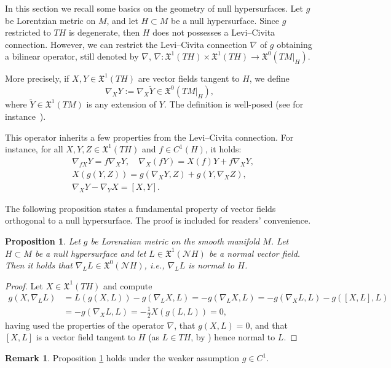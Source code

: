 \documentclass[12pt,a4paper]{amsart}
\theoremstyle{plain}
\newtheorem{proposition}[lemma]{Proposition}
\theoremstyle{definition}
\newtheorem{remark}[lemma]{Remark}
\numberwithin{equation}{section}
\newcommand{\vfield}{\mathfrak{X}}
\newcommand{\normal}{\mathscr{N}}
\begin{document}
In this section we recall some basics on the geometry of null hypersurfaces. 
%
Let $g$ be Lorentzian metric on $M$, and let $H\subset M$ be a null
hypersurface.
%
Since $g$ restricted to $TH$ is degenerate, then $H$ does
not possesses a Levi--Civita connection.
%
However, we can restrict the Levi--Civita connection $\nabla$ of $g$
obtaining a bilinear operator, still denoted by $\nabla$, $\nabla: \vfield^1(TH)\times \vfield^1(TH)
\to\vfield^0 (TM|_{H})$.
%

More precisely, if $X,Y\in\vfield^1(TH)$ are vector fields tangent to
$H$, we define
$$\nabla_X Y:=\nabla_X \tilde Y\in\vfield^0(TM|_H),$$
where
$\tilde Y\in\vfield^1(TM)$ is any extension of $Y$. 
The
definition is well-posed (see for instance~\cite{GallotHulinLafontaine04}).


%
%

This operator inherits a few properties from the
Levi--Civita connection. For instance, for all  $X,Y,Z\in\vfield^1(TH)$ and $f\in C^1(H)$, it holds:
\begin{align*}
  &
    \nabla_{fX} Y
    =f\nabla_X Y
    ,
    \quad
    \nabla_X (fY)
    =X(f) Y+f\nabla_X Y
    ,
  \\
  &
    X( g(Y,Z))
    =
    g(\nabla_X Y,Z)
    +
    g(Y,\nabla_X Z)
    ,
  \\
  &
    \nabla_X Y
    -\nabla_Y X
    =
    [X,Y]
    .
\end{align*}



The following proposition 
states a fundamental property of vector fields orthogonal 
to a null hypersurface. 
The proof is included for readers' convenience. 

\begin{proposition}
\label{P:proportional}
  Let $g$ be Lorenztian metric on the smooth manifold $M$.
  Let $H \subset M$ be a null hypersurface and let $L\in
  \vfield^1(\normal H)$ be a normal vector field.
  Then it holds that $\nabla_LL\in\vfield^0( \normal H)$, i.e.,
  $\nabla_LL$ is normal to $H$.
\end{proposition}
\begin{proof}
  Let $X\in \vfield^1(TH)$ and compute
  \begin{align*}
    g(X,\nabla_L L)
    &
      =
      L(g(X,L))
      -
      g(\nabla_L X,L)
      =
      -
      g(\nabla_L X,L)
      =
      -
      g(\nabla_X L,L)
      -g([X,L],L)
    \\&
      =
      -
      g(\nabla_X L,L)
    =-\frac{1}{2}
    X(g(L,L))
    =0,
  \end{align*}
  having used the properties of the operator $\nabla$, that
  $g(X,L)=0$,
  and that $[X,L]$ is a vector field tangent to $H$ (as $L\in TH$, by ) hence
  normal to $L$.
\end{proof}
\begin{remark}
Proposition \ref{P:proportional} holds under the weaker
    assumption $g\in C^1$.
  \end{remark}
\end{document}

